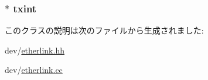 \label{classEtherLink_1_1Link_ab03ddf4a7f12da61f07e2e0c644ef06c}
\hypertarget{classEtherLink_1_1Link_a2bd49a849a4ba011c246866c28d079c2}{
\subsubsection[{txint}]{$\ast$ {\bf txint}}}
\label{classEtherLink_1_1Link_a2bd49a849a4ba011c246866c28d079c2}


このクラスの説明は次のファイルから生成されました:\begin{DoxyCompactItemize}
\item 
dev/\hyperlink{etherlink_8hh}{etherlink.hh}\item 
dev/\hyperlink{etherlink_8cc}{etherlink.cc}\end{DoxyCompactItemize}
